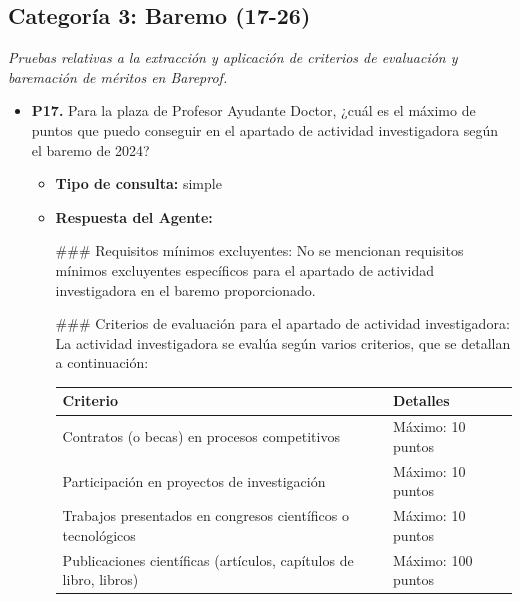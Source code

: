 \documentclass{article}
\begin{document}
\subsection{Categoría 3: Baremo (17-26)}
\textit{Pruebas relativas a la extracción y aplicación de criterios de evaluación y baremación de méritos en Bareprof.}
\begin{itemize}
      \item \textbf{P17.} Para la plaza de Profesor Ayudante Doctor, ¿cuál es el máximo de puntos que puedo conseguir en el apartado de actividad investigadora según el baremo de 2024? \\
            \begin{itemize}
                  \item \textbf{Tipo de consulta:} simple
                  \item \textbf{Respuesta del Agente:}

                        \#\#\# Requisitos mínimos excluyentes:
                        No se mencionan requisitos mínimos excluyentes específicos para el apartado de actividad investigadora en el baremo proporcionado.

                        \#\#\# Criterios de evaluación para el apartado de actividad investigadora:
                        La actividad investigadora se evalúa según varios criterios, que se detallan a continuación:

                        \vspace{0.4cm}
                        \begin{table}[h!]\centering\renewcommand{\arraystretch}{1.3}
                              \begin{tabular}{|p{}|p{}|}\hline
                                    Criterio                                                          & Detalles           \\\hline
                                    Contratos (o becas) en procesos competitivos                      & Máximo: 10 puntos  \\\hline
                                    Participación en proyectos de investigación                       & Máximo: 10 puntos  \\\hline
                                    Trabajos presentados en congresos científicos o tecnológicos      & Máximo: 10 puntos  \\\hline
                                    Publicaciones científicas (artículos, capítulos de libro, libros) & Máximo: 100 puntos \\\hline
                              \end{tabular}\end{table}
                        \vspace{0.4cm}


\end{itemize}
\end{itemize}
\end{document}
